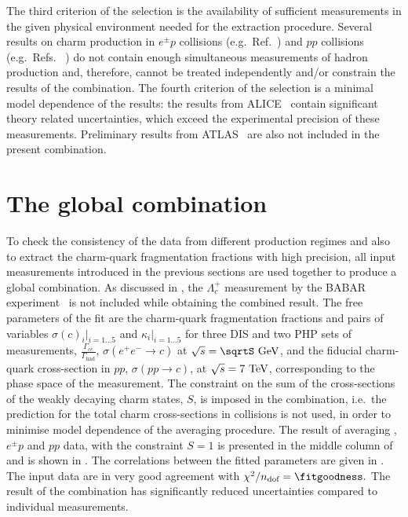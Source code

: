 The third criterion of the selection is the availability of sufficient 
measurements in the given physical environment needed for the extraction 
procedure. 
Several results  on charm production in $e^{\pm}p$ collisions (e.g.\ 
Ref.~\cite{Chekanov:2008yd}) and $pp$ collisions (e.g.\  Refs.
~\cite{Tlusty:2012ix,Ye:2014eia,Acosta:2003ax}) do not contain enough
 simultaneous 
measurements of hadron production and, therefore, cannot be treated 
independently
and/or constrain the results of the combination.
% 
The fourth criterion of the selection is a minimal model dependence of
the results:  the results from ALICE~\cite{Abelev:2012tca,
Abelev:2012vra,ALICE:2011aa} contain significant theory related 
uncertainties, which exceed the experimental precision of these 
measurements. 
%
Preliminary results from ATLAS~\cite{ATLAS:2011fea} are also not 
included in the present combination.
\FloatBarrier
\section{The global combination} 
\label{sec:ffglob}
To check the consistency of the data from different production regimes 
and also to extract the charm-quark fragmentation fractions with  
high precision, all input measurements introduced in the previous 
sections
 are used together to produce a global combination.
%
As discussed in , the $\Lambda_{c}^{+}$ measurement by 
the BABAR  experiment~\cite{Aubert:2006cp} is not included while 
obtaining the combined result. 
%
The free parameters of the fit are the charm-quark fragmentation 
fractions and  pairs of variables $\sigma(c)_{i}|_{i=1\dots 5}$ and 
$\kappa_{i}|_{i=1\dots 5}$  for three DIS and two PHP sets of 
measurements, $\frac{\Gamma_{c\bar c}}{\Gamma_{\text{had}}}$, 
$\sigma(e^+e^-\rightarrow c)$ at 
$\sqrt{s}=\sqrtS~\GeV$, 
and the fiducial charm-quark cross-section in $pp$, 
$\sigma(pp\rightarrow c)$, at $\sqrt{s}=7~{\text{Te}\kern-0.06667em\text{V\/}}$, 
corresponding to the phase space of the measurement. 
%
The constraint on the sum of the cross-sections of the weakly decaying
charm states, $S$, is imposed in the combination, i.e.\ the  
prediction for the total charm cross-sections in \epem collisions
is not used, in order to minimise model dependence
of the averaging procedure. 
The result of averaging \epem, $e^{\pm}p$ and $pp$ data, with the 
constraint $S=1$ is presented in
the middle column of
 and is shown in . The 
correlations between the fitted parameters are given in 
.
%
The input data are in very good agreement with  $\chi^2 / n_\text{dof} 
=\fitgoodness.$
%
The result of the combination has significantly reduced uncertainties 
compared to individual measurements.
%

